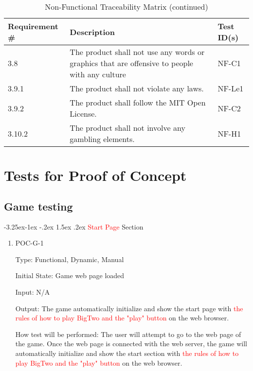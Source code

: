 \documentclass[12pt, titlepage]{article}
\makeatletter
\renewcommand\paragraph{\@startsection{paragraph}{4}{\z@}%
                                     {-3.25ex\@plus -1ex \@minus -.2ex}%
                                     {1.5ex \@plus .2ex}%
                                     {\normalfont\normalsize\bfseries}}
\makeatother
\begin{document}
\begin{table}[h!]
\centering
\caption{Non-Functional Traceability Matrix (continued)}
\label{table:1}
\begin{tabular}{|p{2.5cm} p{10cm} p{2.5cm}|} 
 \hline
 Requirement \# & Description & Test ID(s) \\ 
 \hline
 3.8 & The product shall not use any words or graphics that are offensive to people with any culture & NF-C1 \\
 3.9.1 & The product shall not violate any laws. & NF-Le1 \\
 3.9.2 & The product shall follow the MIT Open License. & NF-C2 \\
 3.10.2 &  The product shall not involve any gambling elements. & NF-H1 \\
 \hline
\end{tabular}
\end{table}



\section{Tests for Proof of Concept}

\subsection{Game testing}
		
\paragraph{\textcolor{red}{Start Page} Section}

\begin{enumerate}

\item{POC-G-1\\}

Type: Functional, Dynamic, Manual
					
Initial State: Game web page loaded
					
Input: N/A 
					
Output: The game automatically initialize and show the start page with \textcolor{red}{the rules of how to play BigTwo and the "play" button} on the web browser.
					
How test will be performed: The user will attempt to go to the web page of the game. Once the web page is connected with the web server, the game will automatically initialize and show the start section with \textcolor{red}{the rules of how to play BigTwo and the "play" button} on the web browser.

\end{enumerate}
\end{document}
